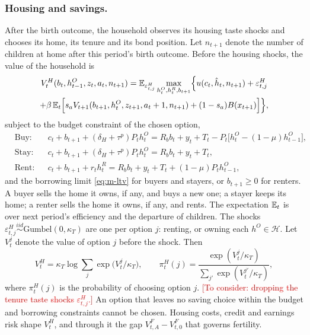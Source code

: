 \subsubsection*{Housing and savings.}
After the birth outcome, the household observes its housing taste shocks and
chooses its home, its tenure and its bond position. Let $n_{t+1}$ denote the
number of children at home after this period's birth outcome. Before the
housing shocks, the value of the household is
\begin{multline}
 V^H_t(b_t,h^O_{t-1},z_t,a_t,n_{t+1})
 =\mathbb E_{\varepsilon^H_{t,j}}\max_{h^O_t,h^R_t,b_{t+1}}
 \Bigl\{u(c_t,\hat h_t,n_{t+1})+\varepsilon^H_{t,j}\\
 +\beta\,\mathbb E_t\Bigl[s_aV_{t+1}(b_{t+1},h^O_t,z_{t+1},a_t+1,n_{t+1})
 +(1-s_a)B(x_{t+1})\Bigr]\Bigr\},
 \label{eq:m-vh}
\end{multline}
subject to the budget constraint of the chosen option,
\begin{equation}
\begin{aligned}
 &\text{Buy:}  && c_t+b_{t+1}+(\delta_H+\tau^p)P_th^O_t=R_bb_t+y_t+T_t-P_t\bigl[h^O_t-(1-\mu)h^O_{t-1}\bigr],\\
 &\text{Stay:} && c_t+b_{t+1}+(\delta_H+\tau^p)P_th^O_t=R_bb_t+y_t+T_t,\\
 &\text{Rent:} && c_t+b_{t+1}+r_th^R_t=R_bb_t+y_t+T_t+(1-\mu)P_th^O_{t-1},
\end{aligned}
 \label{eq:m-budget}
\end{equation}
and the borrowing limit \eqref{eq:m-ltv} for buyers and stayers, or
$b_{t+1}\ge0$ for renters. A buyer sells the home it owns, if any, and buys a
new one; a stayer keeps its home; a renter sells the home it owns, if any, and
rents. The expectation $\mathbb E_t$ is over next period's efficiency and the
departure of children. The shocks
$\varepsilon^H_{t,j}\overset{iid}{\sim}\text{Gumbel}(0,\kappa_T)$ are one per
option $j$: renting, or owning each $h^O\in\mathcal H$. Let $V^j_t$ denote the
value of option $j$ before the shock. Then
\begin{equation}
 V^H_t=\kappa_T\log\sum_{j}\exp\bigl(V^j_t/\kappa_T\bigr),
 \qquad
 \pi^H_t(j)=\frac{\exp(V^j_t/\kappa_T)}{\sum_{j'}\exp(V^{j'}_t/\kappa_T)},
 \label{eq:m-tenure}
\end{equation}
where $\pi^H_t(j)$ is the probability of choosing option $j$. \textcolor{red}{[To consider: dropping the
tenure taste shocks $\varepsilon^H_{t,j}$.]} An option that
leaves no saving choice within the budget and borrowing constraints cannot be
chosen. Housing costs, credit and earnings risk shape $V^H_t$, and through it
the gap $V^F_{t,A}-V^F_{t,0}$ that governs fertility.

